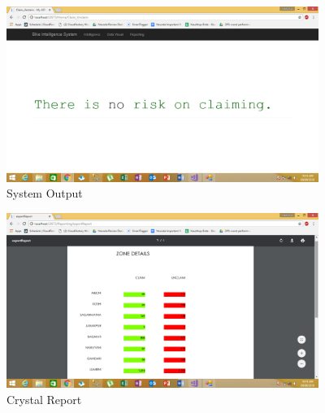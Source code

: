 \begin{figure}[tbh] %
\begin{center}
	\includegraphics[width=4in]{images/Screenshot2.png}
	\caption{System Output} %
	\label{Scr} %
\end{center}
\end{figure}

\begin{figure}[tbh] %
\begin{center}
	\includegraphics[width=4in]{images/Screenshot3.png}
	\caption{Crystal Report} %
	\label{Crystal Report} %
\end{center}
\end{figure}

